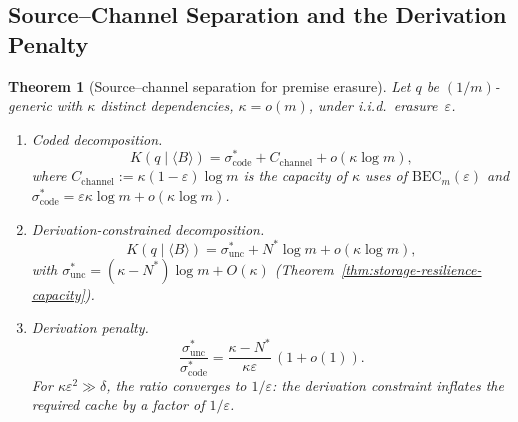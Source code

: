 \documentclass[journal]{IEEEtran}
\newtheorem{theorem}{Theorem}[section]
\numberwithin{equation}{section}
\begin{document}
\subsection{Source--Channel Separation and the Derivation Penalty}
\label{subsec:source-channel}

\begin{theorem}[Source--channel separation for premise erasure]
\label{thm:source-channel-separation}
Let $q$ be $(1/m)$-generic with $\kappa$ distinct dependencies,
$\kappa=o(m)$, under i.i.d.\ erasure~$\varepsilon$.

\begin{enumerate}[label=\textup{(\Roman*)}]
\item \emph{Coded decomposition.}
\begin{equation}\label{eq:coded-decomposition}
  K(q\mid\langle B\rangle)
  =\sigma^*_{\mathrm{code}}
  +C_{\mathrm{channel}}
  +o(\kappa\log m),
\end{equation}
where
$C_{\mathrm{channel}}
:=\kappa(1{-}\varepsilon)\log m$
is the capacity of $\kappa$ uses of
$\mathrm{BEC}_m(\varepsilon)$ and
$\sigma^*_{\mathrm{code}}
=\varepsilon\kappa\log m+o(\kappa\log m)$.

\item \emph{Derivation-constrained decomposition.}
\begin{equation}\label{eq:uncoded-decomposition}
  K(q\mid\langle B\rangle)
  =\sigma^*_{\mathrm{unc}}
  +N^*\log m
  +o(\kappa\log m),
\end{equation}
with $\sigma^*_{\mathrm{unc}}
=(\kappa{-}N^*)\log m+O(\kappa)$
\textup{(Theorem~\ref{thm:storage-resilience-capacity})}.

\item \emph{Derivation penalty.}
\begin{equation}\label{eq:derivation-penalty}
  \frac{\sigma^*_{\mathrm{unc}}}
       {\sigma^*_{\mathrm{code}}}
  =\frac{\kappa-N^*}{\kappa\varepsilon}
   \,(1{+}o(1)).
\end{equation}
For $\kappa\varepsilon^2\gg\delta$, the ratio converges
to $1/\varepsilon$: the derivation constraint inflates the
required cache by a factor of $1/\varepsilon$.
\end{enumerate}
\end{theorem}
\end{document}
